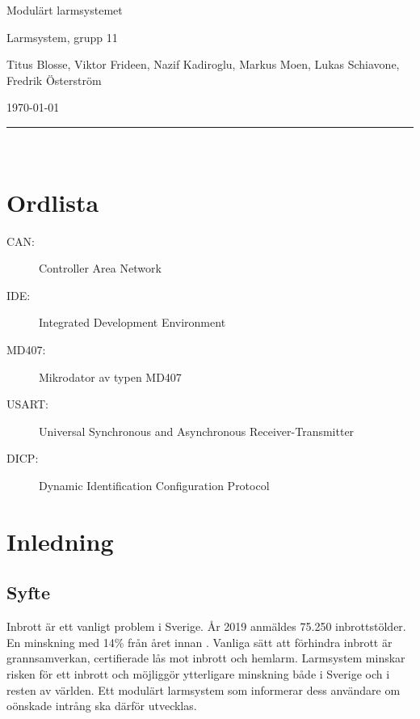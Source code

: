 \documentclass[a4paper]{article}
\newcommand\namn{Larmsystem}
\begin{document}
\thispagestyle{empty}

\begin{center}
    \parskip=14pt
    \vspace*{3\parskip}

    {\LARGE Modulärt larmsystemet}

    {\large \namn, grupp 11

    Titus Blosse, Viktor Frideen, Nazif Kadiroglu, Markus Moen, Lukas Schiavone, Fredrik Österström

    \today}

    \rule{7cm}{0.4pt}\\
\end{center}
\newpage

\thispagestyle{empty}

\tableofcontents
\newpage

\thispagestyle{empty}

\section*{Ordlista}

\begin{description}
    \item[CAN:] Controller Area Network
    \item[IDE:] Integrated Development Environment
    \item[MD407:] Mikrodator av typen MD407
    \item[USART:] Universal Synchronous and Asynchronous Receiver-Transmitter
    \item[DICP:] Dynamic Identification Configuration Protocol
\end{description}
\newpage


\section{Inledning}
\subsection{Syfte}
Inbrott är ett vanligt problem i Sverige.
År 2019 anmäldes 75.250 inbrottstölder.
En minskning med 14\% från året innan \cite{brastold}.
Vanliga sätt att förhindra inbrott är grannsamverkan, certifierade lås mot inbrott och hemlarm.
Larmsystem minskar risken för ett inbrott och möjliggör ytterligare minskning både i Sverige och i resten av världen.
Ett modulärt larmsystem som informerar dess användare om oönskade intrång ska därför utvecklas.
\end{document}
